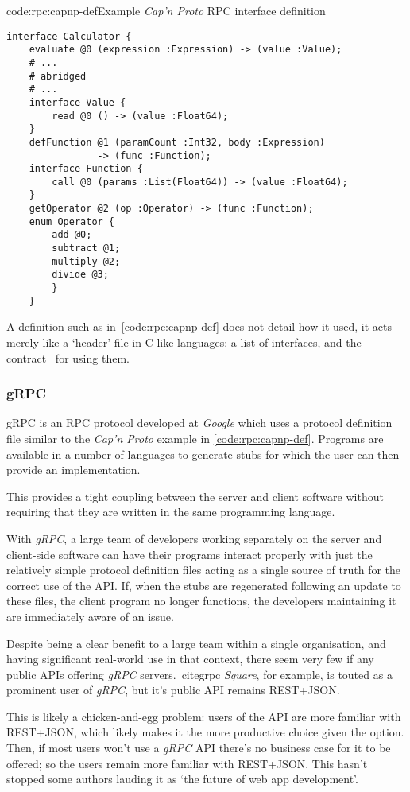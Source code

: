 \begin{codelisting}{code:rpc:capnp-def}{Example \emph{Cap'n Proto} RPC interface definition~\cite{capnp_example}}
\begin{spacing}{1.0}
\begin{verbatim}
interface Calculator {
    evaluate @0 (expression :Expression) -> (value :Value);
    # ...
    # abridged
    # ...
    interface Value {
        read @0 () -> (value :Float64);
    }
    defFunction @1 (paramCount :Int32, body :Expression)
                -> (func :Function);
    interface Function {
        call @0 (params :List(Float64)) -> (value :Float64);
    }
    getOperator @2 (op :Operator) -> (func :Function);
    enum Operator {
        add @0;
        subtract @1;
        multiply @2;
        divide @3;
        }
    }
\end{verbatim}
\end{spacing}
\end{codelisting}

A definition such as in~\cref{code:rpc:capnp-def} does not detail how it used, it acts merely like a `header' file in C-like languages: a list of interfaces, and the contract~ for using them.

\subsubsection{gRPC} \label{soln:rpc:grpc}

gRPC is an RPC protocol developed at \emph{Google} which uses a protocol definition file similar to the \emph{Cap'n Proto} example in \cref{code:rpc:capnp-def}. Programs are available in a number of languages to generate stubs for which the user can then provide an implementation. \cite{grpc}

This provides a tight coupling between the server and client software without requiring that they are written in the same programming language.

With \emph{gRPC}, a large team of developers working separately on the server and client-side software can have their programs interact properly with just the relatively simple protocol definition files acting as a single source of truth for the correct use of the API. If, when the stubs are regenerated following an update to these files, the client program no longer functions, the developers maintaining it are immediately aware of an issue.

Despite being a clear benefit to a large team within a single organisation, and having significant real-world use in that context, there seem very few if any public APIs offering \emph{gRPC} servers.~cite{grpc} \emph{Square}, for example, is touted as a prominent user of \emph{gRPC}, but it's public API remains REST+JSON.~\cite{square_api}

This is likely a chicken-and-egg problem: users of the API are more familiar with REST+JSON, which likely makes it the more productive  choice given the option. Then, if most users won't use a \emph{gRPC} API there's no business case for it to be offered; so the users remain more familiar with REST+JSON. This hasn't stopped some authors lauding it as `the future of web app development'.~\cite{grpc_web}